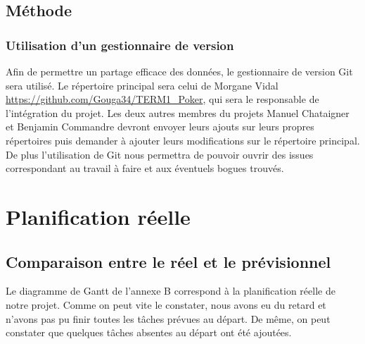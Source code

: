 \documentclass{report}
\begin{document}
\section{Méthode}
\subsection{Utilisation d'un gestionnaire de version}
\hspace{0.5cm}Afin de permettre un partage efficace des données, le gestionnaire de version Git sera utilisé. Le répertoire principal sera celui de Morgane Vidal \url{https://github.com/Gouga34/TERM1_Poker}, qui sera le responsable de l'intégration du projet. Les deux autres membres du projets Manuel Chataigner et Benjamin Commandre devront envoyer leurs ajouts sur leurs propres répertoires puis demander à ajouter leurs modifications sur le répertoire principal. De plus l'utilisation de Git nous permettra de pouvoir ouvrir des issues correspondant au travail à faire et aux éventuels bogues trouvés.\par

\chapter{Planification réelle}
\section{Comparaison entre le réel et le prévisionnel}
\hspace{0.5cm}Le diagramme de Gantt de l'annexe B correspond à la planification réelle de notre projet. Comme on peut vite le constater, nous avons eu du retard et n'avons pas pu finir toutes les tâches prévues au départ. De même, on peut constater que quelques tâches absentes au départ ont été ajoutées.\par
\end{document}
